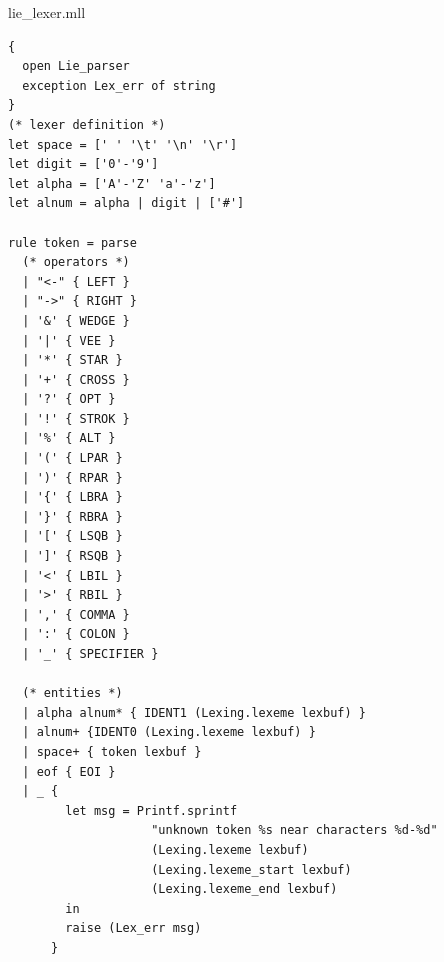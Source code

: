 \documentclass[12pt]{article}
\begin{document}
\pagebreak
lie\_lexer.mll
\begin{tiny}
\begin{verbatim}
{
  open Lie_parser
  exception Lex_err of string
}
(* lexer definition *)
let space = [' ' '\t' '\n' '\r']
let digit = ['0'-'9']
let alpha = ['A'-'Z' 'a'-'z']
let alnum = alpha | digit | ['#']

rule token = parse
  (* operators *)
  | "<-" { LEFT }
  | "->" { RIGHT }
  | '&' { WEDGE }
  | '|' { VEE }
  | '*' { STAR }
  | '+' { CROSS }
  | '?' { OPT }
  | '!' { STROK }
  | '%' { ALT }
  | '(' { LPAR }
  | ')' { RPAR }
  | '{' { LBRA }
  | '}' { RBRA }
  | '[' { LSQB }
  | ']' { RSQB }
  | '<' { LBIL }
  | '>' { RBIL }
  | ',' { COMMA }
  | ':' { COLON }
  | '_' { SPECIFIER }
  
  (* entities *)
  | alpha alnum* { IDENT1 (Lexing.lexeme lexbuf) }
  | alnum+ {IDENT0 (Lexing.lexeme lexbuf) }
  | space+ { token lexbuf }
  | eof { EOI }
  | _ {
        let msg = Printf.sprintf
                    "unknown token %s near characters %d-%d"
                    (Lexing.lexeme lexbuf)
                    (Lexing.lexeme_start lexbuf)
                    (Lexing.lexeme_end lexbuf)
        in
        raise (Lex_err msg)
      }
\end{verbatim}
\end{tiny}
\end{document}
